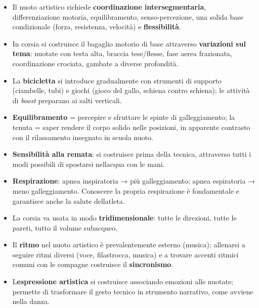 \documentclass[a4paper,11pt]{article}
\providecommand{\tightlist}{%
  \setlength{\itemsep}{0pt}\setlength{\parskip}{0pt}}
\begin{document}
\begin{itemize}
      \tightlist
      \item
            Il nuoto artistico richiede \textbf{coordinazione intersegmentaria},
            differenziazione motoria, equilibramento, senso-percezione, una solida
            base condizionale (forza, resistenza, velocità) e
            \textbf{flessibilità}.
      \item
            In corsia si costruisce il bagaglio motorio di base attraverso
            \textbf{variazioni sul tema}: nuotate con testa alta, braccia
            tese/flesse, fase aerea frazionata, coordinazione crociata, gambate a
            diverse profondità.
      \item
            La \textbf{bicicletta} si introduce gradualmente con strumenti di
            supporto (ciambelle, tubi) e giochi (gioco del gallo, schiena contro
            schiena); le attività di \emph{boost} preparano ai salti verticali.
      \item
            \textbf{Equilibramento} = percepire e sfruttare le spinte di
            galleggiamento; la tenuta = saper rendere il corpo solido nelle
            posizioni, in apparente contrasto con il rilassamento insegnato in
            scuola nuoto.
      \item
            \textbf{Sensibilità alla remata}: si costruisce prima della tecnica,
            attraverso tutti i modi possibili di spostarsi
            nell\textquotesingle acqua con le mani.
      \item
            \textbf{Respirazione}: apnea inspiratoria → più galleggiamento; apnea
            espiratoria → meno galleggiamento. Conoscere la propria respirazione è
            fondamentale e garantisce anche la salute dell\textquotesingle atleta.
      \item
            La corsia va usata in modo \textbf{tridimensionale}: tutte le
            direzioni, tutte le pareti, tutto il volume subacqueo.
      \item
            Il \textbf{ritmo} nel nuoto artistico è prevalentemente esterno
            (musica); allenarsi a seguire ritmi diversi (voce, filastrocca,
            musica) e a trovare accenti ritmici comuni con le compagne costruisce
            il \textbf{sincronismo}.
      \item
            L\textquotesingle{}\textbf{espressione artistica} si costruisce
            associando emozioni alle nuotate; permette di trasformare il gesto
            tecnico in strumento narrativo, come avviene nella danza.
\end{itemize}
\end{document}
